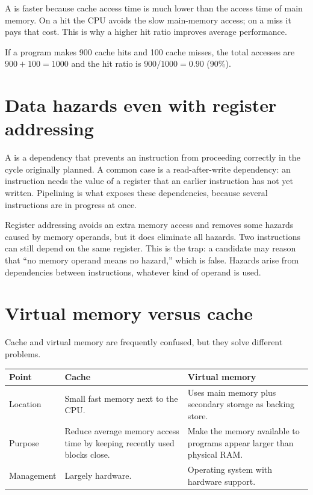 A  is faster because cache access time is much lower than the access
time of main memory. On a hit the CPU avoids the slow main-memory access; on
a miss it pays that cost. This is why a higher hit ratio improves average
performance.

\begin{example}
If a program makes 900 cache hits and 100 cache misses, the total accesses
are $900+100=1000$ and the hit ratio is $900/1000 = 0.90$ (90\%).
\end{example}

\section{Data hazards even with register addressing}
A  is a dependency that prevents an instruction from
proceeding correctly in the cycle originally planned. A common case is a
read-after-write dependency: an instruction needs the value of a register
that an earlier instruction has not yet written. Pipelining is what exposes
these dependencies, because several instructions are in progress at once.

Register addressing avoids an extra memory access and removes some hazards
caused by memory operands, but it does  eliminate all hazards. Two
instructions can still depend on the same register. This is the trap: a
candidate may reason that ``no memory operand means no hazard,'' which is
false. Hazards arise from dependencies between instructions, whatever kind of
operand is used.

\section{Virtual memory versus cache}
Cache and virtual memory are frequently confused, but they solve different
problems.

\begin{center}
\begin{tabular}{p{}p{}p{}}
\toprule
\textbf{Point} & \textbf{Cache} & \textbf{Virtual memory} \\
\midrule
Location & Small fast memory next to the CPU. & Uses main memory plus secondary storage as backing store. \\
Purpose & Reduce average memory access time by keeping recently used blocks close. & Make the memory available to programs appear larger than physical RAM. \\
Management & Largely hardware. & Operating system with hardware support. \\
\bottomrule
\end{tabular}
\end{center}

